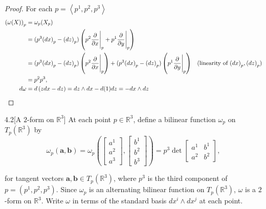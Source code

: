 \begin{proof}
    For each \( p = \left\langle{p^{1}, p^{2}, p^{3}}\right\rangle \)
    \begingroup
    \allowdisplaybreaks%
    \begin{align*}
        {(\omega(X))}_{p} & = \omega_{p}(X_{p})                                                                                                                                                                                                                            \\
                          & = (p^{3}{(dx)}_{p} - {(dz)}_{p})\left(p^{2}\frac{\partial}{\partial x}\Bigg{\vert}_{p} + p^{1}\frac{\partial}{\partial y}\Bigg{\vert}_{p}\right)                                                                                               \\
                          & = (p^{3}{(dx)}_{p} - {(dz)}_{p})\left(p^{2}\frac{\partial}{\partial x}\Bigg{\vert}_{p}\right) + (p^{3}{(dx)}_{p} - {(dz)}_{p})\left(p^{1}\frac{\partial}{\partial y}\Bigg{\vert}_{p}\right) & \text{(linearity of \({(dx)}_{p}, {(dz)}_{p}\))} \\
                          & = p^{2}p^{3},                                                                                                                                                                                                                                  \\
        d\omega           & = d\left( zdx - dz \right) = dz\wedge dx - d(1)dz = -dx\wedge dz
    \end{align*}
    \endgroup
\end{proof}

\begin{problem}{4.2}[A \(2\)-form on \(\mathbb{R}^{3}\)]
At each point \(p\in\mathbb{R}^{3}\), define a bilinear function \(\omega_{p}\) on \( T_{p}(\mathbb{R}^{3}) \) by
\[
    \omega_{p}(\mathbf{a}, \mathbf{b}) = \omega_{p}\left(\begin{bmatrix}a^{1} \\ a^{2} \\ a^{3}\end{bmatrix}, \begin{bmatrix}b^{1} \\ b^{2} \\ b^{3}\end{bmatrix}\right) = p^{3}\det\begin{bmatrix}a^{1} & b^{1} \\ a^{2} & b^{2}\end{bmatrix},
\]

for tangent vectors \( \mathbf{a}, \mathbf{b} \in T_{p}(\mathbb{R}^{3}) \), where \(p^{3}\) is the third component of \(p = (p^{1}, p^{2}, p^{3})\). Since \(\omega_{p}\) is an alternating bilinear function on \(T_{p}(\mathbb{R}^{3})\), \(\omega\) is a \(2\)-form on \(\mathbb{R}^{3}\). Write \(\omega\) in terms of the standard basis \( dx^{i} \wedge dx^{j} \) at each point.
\end{problem}

